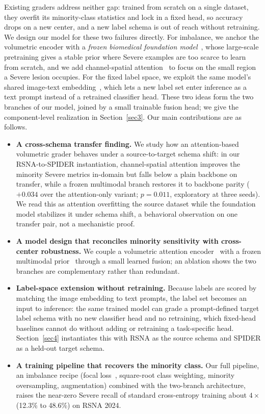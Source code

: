 \documentclass[runningheads]{llncs}
\begin{document}
Existing graders address neither gap: trained from scratch on a single dataset, they overfit its minority-class statistics and lock in a fixed head, so accuracy drops on a new center, and a new label schema is out of reach without retraining. We design our model for these two failures directly. For imbalance, we anchor the volumetric encoder with a \emph{frozen biomedical foundation model}~\cite{zhang2023biomedclip}, whose large-scale pretraining gives a stable prior where Severe examples are too scarce to learn from scratch, and we add channel-spatial attention~\cite{woo2018cbam} to focus on the small region a Severe lesion occupies. For the fixed label space, we exploit the same model's shared image-text embedding~\cite{radford2021clip}, which lets a new label set enter inference as a text prompt instead of a retrained classifier head. These two ideas form the two branches of our model, joined by a small trainable fusion head; we give the component-level realization in Section~\ref{sec3}. Our main contributions are as follows.
\begin{itemize}
    \item \textbf{A cross-schema transfer finding.} We study how an attention-based volumetric grader behaves under a source-to-target schema shift: in our RSNA-to-SPIDER instantiation, channel-spatial attention improves the minority Severe metrics in-domain but falls below a plain backbone on transfer, while a frozen multimodal branch restores it to backbone parity ($+0.034$ over the attention-only variant; $p=0.011$, exploratory at three seeds). We read this as attention overfitting the source dataset while the foundation model stabilizes it under schema shift, a behavioral observation on one transfer pair, not a mechanistic proof.
    \item \textbf{A model design that reconciles minority sensitivity with cross-center robustness.} We couple a volumetric attention encoder~\cite{woo2018cbam} with a frozen multimodal prior~\cite{zhang2023biomedclip} through a small learned fusion; an ablation shows the two branches are complementary rather than redundant.
    \item \textbf{Label-space extension without retraining.} Because labels are scored by matching the image embedding to text prompts, the label set becomes an input to inference: the same trained model can grade a prompt-defined target label schema with no new classifier head and no retraining, which fixed-head baselines cannot do without adding or retraining a task-specific head. Section~\ref{sec4} instantiates this with RSNA as the source schema and SPIDER as a held-out target schema.
    \item \textbf{A training pipeline that recovers the minority class.} Our full pipeline, an imbalance recipe (focal loss~\cite{lin2017focal}, square-root class weighting, minority oversampling, augmentation) combined with the two-branch architecture, raises the near-zero Severe recall of standard cross-entropy training about $4\times$ (12.3\% to 48.6\%) on RSNA 2024.
\end{itemize}
\end{document}
